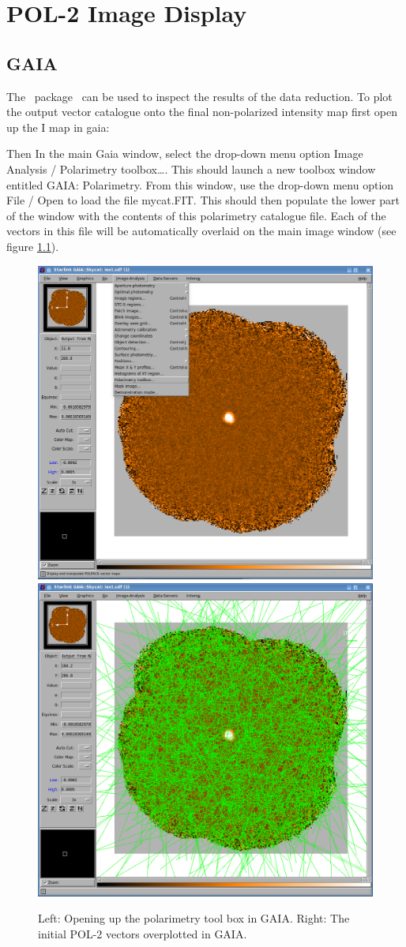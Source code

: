 \chapter{POL-2 Image Display}
\label{sec:display}

\section{GAIA}

The \starlink\ package \gaia\ can be used to inspect the results of the data reduction. 
To plot the output vector catalogue onto the final non-polarized intensity map
first open up the I map in gaia:

\begin{terminalv}
\end{terminalv}


Then In the main Gaia window, select the drop-down menu option Image Analysis / 
Polarimetry toolbox…. This should launch a new toolbox window entitled 
GAIA: Polarimetry. From this window, use the drop-down menu option 
File / Open to load the file mycat.FIT. This should then populate the lower part of the 
window with the contents of this polarimetry catalogue file. 
Each of the vectors in this file will be automatically overlaid on the main image window 
(see figure \ref{fig:gaia-plot-vectors1}).

\begin{figure}[t!]
\begin{center}
\includegraphics[width=0.46\linewidth]{sc22-gaia-plot-vectors-1.png}
\includegraphics[width=0.46\linewidth]{sc22-gaia-plot-vectors-3.png}
\label{fig:gaia-plot-vectors1}
\caption [Over Plotting Vectors in GAIA]{
  \small Left: Opening up the polarimetry tool box in GAIA. Right: The initial POL-2 
vectors overplotted in GAIA.
}
\end{center}
\end{figure}

